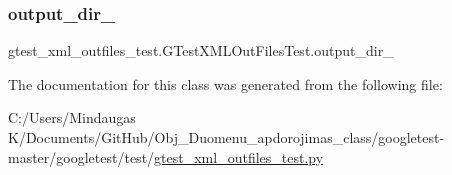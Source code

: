 \subsubsection{\texorpdfstring{output\_dir\_}{output\_dir\_}}
{\footnotesize\ttfamily gtest\+\_\+xml\+\_\+outfiles\+\_\+test.\+G\+Test\+X\+M\+L\+Out\+Files\+Test.\+output\+\_\+dir\+\_\+}



The documentation for this class was generated from the following file\+:\begin{DoxyCompactItemize}
\item 
C\+:/\+Users/\+Mindaugas K/\+Documents/\+Git\+Hub/\+Obj\+\_\+\+Duomenu\+\_\+apdorojimas\+\_\+class/googletest-\/master/googletest/test/\mbox{\hyperlink{googletest-master_2googletest_2test_2gtest__xml__outfiles__test_8py}{gtest\+\_\+xml\+\_\+outfiles\+\_\+test.\+py}}\end{DoxyCompactItemize}
